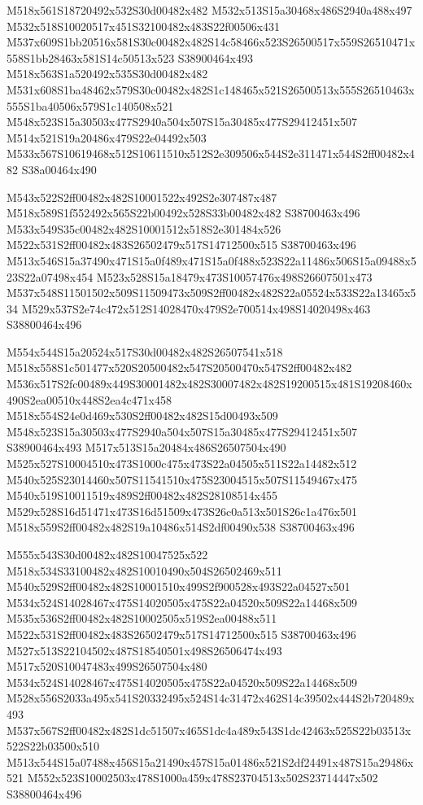 \documentclass{article}
\begin{document}
\begin{multicols}{2}
M518x561S18720492x532S30d00482x482 M532x513S15a30468x486S2940a488x497 M532x518S10020517x451S32100482x483S22f00506x431 M537x609S1bb20516x581S30c00482x482S14c58466x523S26500517x559S26510471x558S1bb28463x581S14c50513x523 S38900464x493 M518x563S1a520492x535S30d00482x482 M531x608S1ba48462x579S30c00482x482S1c148465x521S26500513x555S26510463x555S1ba40506x579S1c140508x521 M548x523S15a30503x477S2940a504x507S15a30485x477S29412451x507 M514x521S19a20486x479S22e04492x503 M533x567S10619468x512S10611510x512S2e309506x544S2e311471x544S2ff00482x482 S38a00464x490

M543x522S2ff00482x482S10001522x492S2e307487x487 M518x589S1f552492x565S22b00492x528S33b00482x482 S38700463x496 M533x549S35c00482x482S10001512x518S2e301484x526 M522x531S2ff00482x483S26502479x517S14712500x515 S38700463x496 M513x546S15a37490x471S15a0f489x471S15a0f488x523S22a11486x506S15a09488x523S22a07498x454 M523x528S15a18479x473S10057476x498S26607501x473 M537x548S11501502x509S11509473x509S2ff00482x482S22a05524x533S22a13465x534 M529x537S2e74c472x512S14028470x479S2e700514x498S14020498x463 S38800464x496

M554x544S15a20524x517S30d00482x482S26507541x518 M518x558S1c501477x520S20500482x547S20500470x547S2ff00482x482 M536x517S2fc00489x449S30001482x482S30007482x482S19200515x481S19208460x490S2ea00510x448S2ea4c471x458 M518x554S24e0d469x530S2ff00482x482S15d00493x509 M548x523S15a30503x477S2940a504x507S15a30485x477S29412451x507 S38900464x493 M517x513S15a20484x486S26507504x490 M525x527S10004510x473S1000c475x473S22a04505x511S22a14482x512 M540x525S23014460x507S11541510x475S23004515x507S11549467x475 M540x519S10011519x489S2ff00482x482S28108514x455 M529x528S16d51471x473S16d51509x473S26c0a513x501S26c1a476x501 M518x559S2ff00482x482S19a10486x514S2df00490x538 S38700463x496

M555x543S30d00482x482S10047525x522 M518x534S33100482x482S10010490x504S26502469x511 M540x529S2ff00482x482S10001510x499S2f900528x493S22a04527x501 M534x524S14028467x475S14020505x475S22a04520x509S22a14468x509 M535x536S2ff00482x482S10002505x519S2ea00488x511 M522x531S2ff00482x483S26502479x517S14712500x515 S38700463x496 M527x513S22104502x487S18540501x498S26506474x493 M517x520S10047483x499S26507504x480 M534x524S14028467x475S14020505x475S22a04520x509S22a14468x509 M528x556S2033a495x541S20332495x524S14c31472x462S14c39502x444S2b720489x493 M537x567S2ff00482x482S1dc51507x465S1dc4a489x543S1dc42463x525S22b03513x522S22b03500x510 M513x544S15a07488x456S15a21490x457S15a01486x521S2df24491x487S15a29486x521 M552x523S10002503x478S1000a459x478S23704513x502S23714447x502 S38800464x496


\end{multicols}
\end{document}
